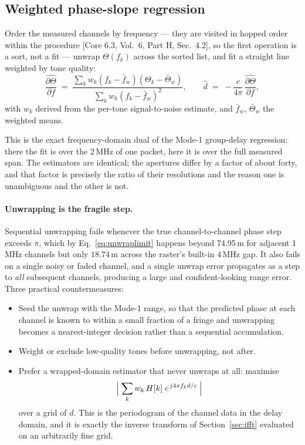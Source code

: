 \documentclass[11pt,a4paper]{article}
\newcommand{\core}[1]{\textcolor{rulegrey}{\small[Core 6.3, #1]}}
\begin{document}
\subsection{Weighted phase-slope regression}
\label{sec:slope}

Order the measured channels by frequency --- they are visited in hopped order within the procedure
\core{Vol.\ 6, Part H, Sec.\ 4.2}, so the first operation is a sort, not a fit --- unwrap
$\Theta(f_k)$ across the sorted list, and fit a straight line weighted by tone quality:
\begin{equation}
\widehat{\frac{\partial\Theta}{\partial f}} \;=\;
\frac{\sum_k w_k (f_k-\bar f_w)(\Theta_k-\bar\Theta_w)}{\sum_k w_k (f_k-\bar f_w)^2},
\qquad
\hat d \;=\; -\frac{c}{4\pi}\,\widehat{\frac{\partial\Theta}{\partial f}},
\label{eq:slopefit}
\end{equation}
with $w_k$ derived from the per-tone signal-to-noise estimate, and $\bar f_w$, $\bar\Theta_w$ the
weighted means.

This is the exact frequency-domain dual of the Mode-1 group-delay regression: there the fit is over
the 2\,MHz of one packet, here it is over the full measured span. The estimators are identical; the
apertures differ by a factor of about forty, and that factor is precisely the ratio of their
resolutions and the reason one is unambiguous and the other is not.

\paragraph{Unwrapping is the fragile step.} Sequential unwrapping fails whenever the true
channel-to-channel phase step exceeds $\pi$, which by Eq.~\eqref{eq:unwraplimit} happens beyond
74.95\,m for adjacent 1\,MHz channels but only $18.74$\,m across the raster's built-in $4$\,MHz gap. It also fails on a single noisy or
faded channel, and a single unwrap error propagates as a step to \emph{all} subsequent channels,
producing a large and confident-looking range error. Three practical countermeasures:

\begin{itemize}[leftmargin=1.4em,itemsep=1pt]
  \item Seed the unwrap with the Mode-1 range, so that the predicted phase at each channel is known
    to within a small fraction of a fringe and unwrapping becomes a nearest-integer decision rather
    than a sequential accumulation.
  \item Weight or exclude low-quality tones before unwrapping, not after.
  \item Prefer a wrapped-domain estimator that never unwraps at all: maximise
    \[
      \Bigl|\;\sum_k w_k\, H[k]\; e^{\,j 4\pi f_k d/c}\;\Bigr|
    \]
    over a grid of $d$. This is the periodogram of the channel data in the delay domain, and it is
    exactly the inverse transform of Section~\ref{sec:ifft} evaluated on an arbitrarily fine grid.
\end{itemize}
\end{document}
